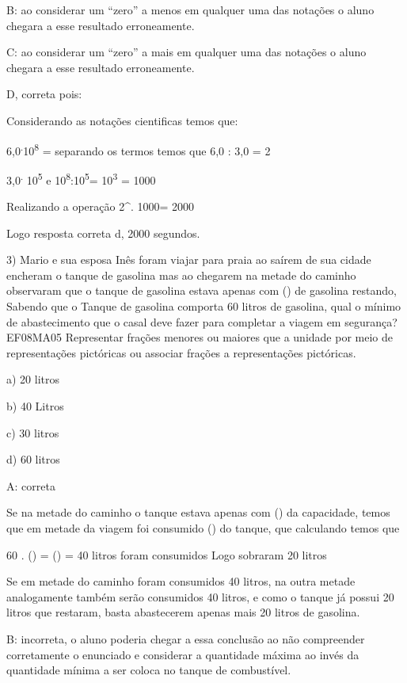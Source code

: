 B: ao considerar um ``zero'' a menos em qualquer uma das notações o
aluno chegara a esse resultado erroneamente.

C: ao considerar um ``zero'' a mais em qualquer uma das notações o aluno
chegara a esse resultado erroneamente.

D, correta pois:

Considerando as notações cientificas temos que:

6,0\textsuperscript{.}10\textsuperscript{8} = separando os termos temos
que 6,0 : 3,0 = 2

3,0\textsuperscript{.} 10\textsuperscript{5} e
10\textsuperscript{8}:10\textsuperscript{5}= 10\textsuperscript{3} =
1000

Realizando a operação 2^{.} 1000= 2000

Logo resposta correta d, 2000 segundos.

3) Mario e sua esposa Inês foram viajar para praia ao saírem de sua
cidade encheram o tanque de gasolina mas ao chegarem na metade do
caminho observaram que o tanque de gasolina estava apenas com
() de gasolina restando, Sabendo que o Tanque de gasolina
comporta 60 litros de gasolina, qual o mínimo de abastecimento que o
casal deve fazer para completar a viagem em segurança? EF08MA05
Representar frações menores ou maiores que a unidade por meio de
representações pictóricas ou associar frações a representações
pictóricas.

a) 20 litros

b) 40 Litros

c) 30 litros

d) 60 litros

A: correta

Se na metade do caminho o tanque estava apenas com () da
capacidade, temos que em metade da viagem foi consumido ()
do tanque, que calculando temos que

60 . () = () = 40 litros foram consumidos
Logo sobraram 20 litros

Se em metade do caminho foram consumidos 40 litros, na outra metade
analogamente também serão consumidos 40 litros, e como o tanque já
possui 20 litros que restaram, basta abastecerem apenas mais 20 litros
de gasolina.

B: incorreta, o aluno poderia chegar a essa conclusão ao não compreender
corretamente o enunciado e considerar a quantidade máxima ao invés da
quantidade mínima a ser coloca no tanque de combustível.

